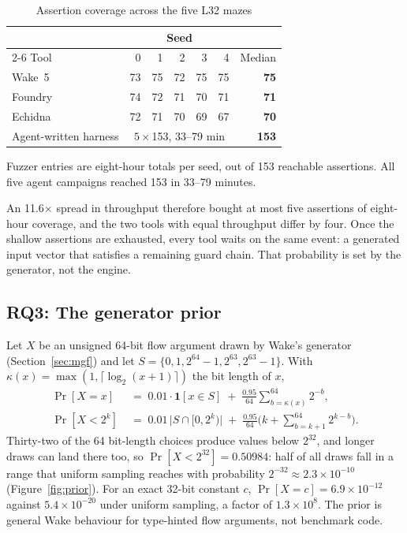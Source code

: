 \documentclass[11pt,a4paper]{article}
\newcommand{\wake}{Wake}
\newcommand{\tablenote}[1]{\par\smallskip\begin{minipage}{\linewidth}\footnotesize\raggedright #1\end{minipage}}
\begin{document}
\begin{table}[t]
\centering\small
\caption{Assertion coverage across the five L32 mazes}
\label{tab:endpoints}
\setlength{\tabcolsep}{4pt}
\begin{tabular}{@{}l*{5}{r}r@{}}
\toprule
 & \multicolumn{5}{c}{Seed} & \\
\cmidrule(lr){2-6}
Tool & 0 & 1 & 2 & 3 & 4 & Median \\
\midrule
\wake{}~5 & 73 & 75 & 72 & 75 & 75 & \textbf{75} \\
Foundry & 74 & 72 & 71 & 70 & 71 & \textbf{71} \\
Echidna & 72 & 71 & 70 & 69 & 67 & \textbf{70} \\
\midrule
Agent-written harness & \multicolumn{5}{c}{$5\times$153, 33--79 min} & \textbf{153} \\
\bottomrule
\end{tabular}
\tablenote{Fuzzer entries are eight-hour totals per seed, out of 153 reachable assertions. All five agent campaigns reached 153 in 33--79 minutes.}
\end{table}

An 11.6$\times$ spread in throughput therefore bought at most five assertions of eight-hour coverage, and the two tools with equal throughput differ by four. Once the shallow assertions are exhausted, every tool waits on the same event: a generated input vector that satisfies a remaining guard chain. That probability is set by the generator, not the engine.

\subsection{RQ3: The generator prior}
\label{sec:prior}

Let $X$ be an unsigned 64-bit flow argument drawn by \wake{}'s generator (Section~\ref{sec:mgf}) and let $S=\{0,1,2^{64}-1,2^{63},2^{63}-1\}$. With $\kappa(x)=\max(1,\lceil\log_2(x+1)\rceil)$ the bit length of $x$,
\begin{align}
\Pr[X=x] \;&=\; 0.01\cdot\mathbf{1}[x\in S] \;+\; \frac{0.95}{64}\sum_{b=\kappa(x)}^{64} 2^{-b}, \label{eq:prior}\\
\Pr[X<2^{k}] \;&=\; 0.01\,\big|S\cap[0,2^k)\big| \;+\; \frac{0.95}{64}\Big(k+\sum_{b=k+1}^{64}2^{k-b}\Big). \label{eq:priorcdf}
\end{align}
Thirty-two of the 64 bit-length choices produce values below $2^{32}$, and longer draws can land there too, so $\Pr[X<2^{32}]=0.50984$: half of all draws fall in a range that uniform sampling reaches with probability $2^{-32}\approx 2.3\times10^{-10}$ (Figure~\ref{fig:prior}). For an exact 32-bit constant $c$, $\Pr[X=c]=6.9\times10^{-12}$ against $5.4\times10^{-20}$ under uniform sampling, a factor of $1.3\times10^{8}$. The prior is general \wake{} behaviour for type-hinted flow arguments, not benchmark code.
\end{document}
